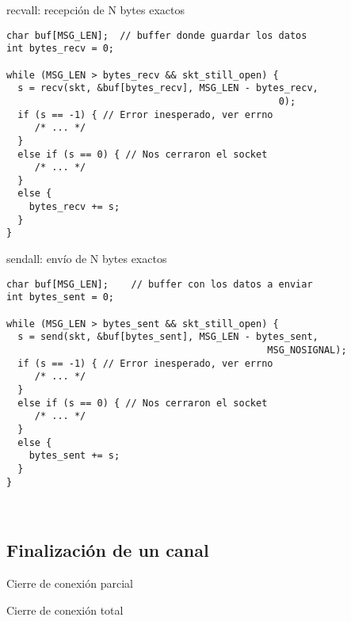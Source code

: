 \begin{frame}[fragile]{recvall: recepci\'on de N bytes exactos}
      \begin{lstlisting}[style=normal]
char buf[MSG_LEN];  // buffer donde guardar los datos
int bytes_recv = 0;

while (MSG_LEN > bytes_recv && skt_still_open) {
  s = recv(skt, &buf[bytes_recv], MSG_LEN - bytes_recv,
                                                0);
  if (s == -1) { // Error inesperado, ver errno
     /* ... */
  }
  else if (s == 0) { // Nos cerraron el socket
     /* ... */
  }
  else {
    bytes_recv += s;
  }
}
      \end{lstlisting}
\end{frame}
\begin{frame}[fragile]{sendall: env\'io de N bytes exactos}
      \begin{lstlisting}[style=normal]
char buf[MSG_LEN];    // buffer con los datos a enviar
int bytes_sent = 0;

while (MSG_LEN > bytes_sent && skt_still_open) {
  s = send(skt, &buf[bytes_sent], MSG_LEN - bytes_sent,
                                              MSG_NOSIGNAL);
  if (s == -1) { // Error inesperado, ver errno
     /* ... */
  }
  else if (s == 0) { // Nos cerraron el socket
     /* ... */
  }
  else {
    bytes_sent += s;
  }
}
      \end{lstlisting}
\end{frame}

~%
\subsection{Finalizaci\'on de un canal}
\begin{frame}{Cierre de conexi\'on parcial}
\end{frame}

\begin{frame}{Cierre de conexi\'on total}
\end{frame}

